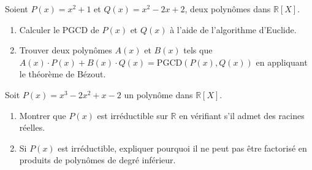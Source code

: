 \begin{exercice}
Soient \( P(x) = x^2 + 1 \) et \( Q(x) = x^2 - 2x + 2 \), deux polynômes dans \( \mathbb{R}[X] \).
\begin{enumerate}
    \item Calculer le PGCD de \( P(x) \) et \( Q(x) \) à l’aide de l’algorithme d’Euclide.
    \item Trouver deux polynômes \( A(x) \) et \( B(x) \) tels que \( A(x) \cdot P(x) + B(x) \cdot Q(x) = \text{PGCD}(P(x), Q(x)) \) en appliquant le théorème de Bézout.
\end{enumerate}
\end{exercice}

\begin{exercice}
Soit \( P(x) = x^3 - 2x^2 + x - 2 \) un polynôme dans \( \mathbb{R}[X] \).
\begin{enumerate}
    \item Montrer que \( P(x) \) est irréductible sur \( \mathbb{R} \) en vérifiant s’il admet des racines réelles.
    \item Si \( P(x) \) est irréductible, expliquer pourquoi il ne peut pas être factorisé en produits de polynômes de degré inférieur.
\end{enumerate}
\end{exercice}

